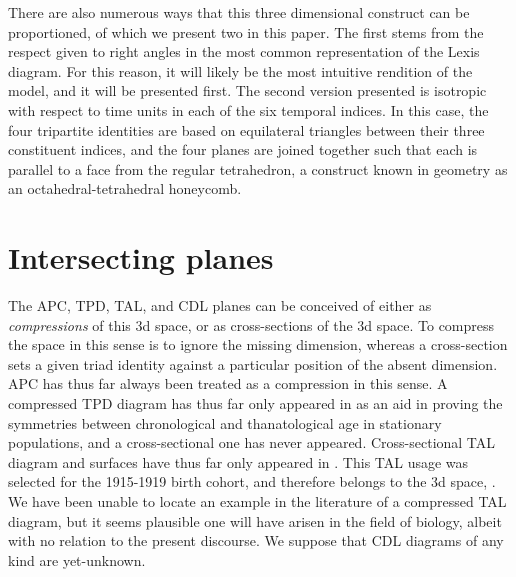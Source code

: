 \documentclass[12pt,oneside,letter]{article} %
\begin{document}
There are also
numerous ways that this three dimensional construct can be proportioned, of
which we present two in this paper. The first stems from the respect given to
right angles in the most common representation of the Lexis diagram. For this reason, it will likely be
the most intuitive rendition of the model, and it will be presented first. The
second version presented is isotropic with respect to time units in each of the
six temporal indices. In this case, the four tripartite identities are based on
equilateral triangles between their three constituent indices, and the four
planes are joined together such that each is parallel to a face from the regular
tetrahedron, a construct known in geometry as an octahedral-tetrahedral
honeycomb.

\section*{Intersecting planes}

The APC, TPD, TAL, and CDL planes can be conceived of either as
\textit{compressions} of this 3d space, or as cross-sections of the 3d space. To
compress the space in this sense is to ignore the missing dimension,
whereas a cross-section sets a given triad identity against a particular
position of the absent dimension. APC has thus far always been treated as a
compression in this sense.
A compressed TPD diagram has thus far only appeared in \citet{pancho2015}
as an aid in proving the symmetries between chronological and thanatological age in stationary populations, and a cross-sectional one has
never appeared.
Cross-sectional TAL diagram and surfaces have thus far only appeared in
\citet{riffe2015ttd}. This TAL usage was selected for the 1915-1919 birth
cohort, and therefore belongs to the 3d
space,
.
We have been unable to locate an example in the literature of a compressed
TAL diagram, but it seems plausible one will have arisen in the field of
biology, albeit with no relation to the present discourse. We suppose
that CDL diagrams of any kind are yet-unknown.
\end{document}
